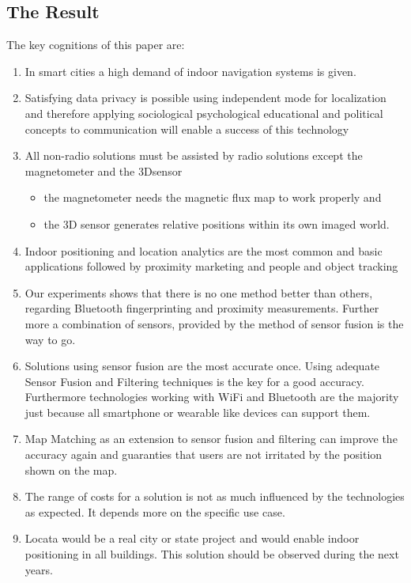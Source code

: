 \subsection{The Result}
The key cognitions of this paper are:
\begin{enumerate}
	\item In smart cities a high demand of indoor navigation systems is given.
	\item Satisfying data privacy is possible using independent mode for localization and therefore applying sociological psychological educational and political concepts to communication will enable a success of this technology
	\item All non-radio solutions must be assisted by radio solutions except the magnetometer and the 3Dsensor
	\begin{itemize}
		\item the magnetometer needs the magnetic flux map to work properly and
		\item the 3D sensor generates relative positions within its own imaged world.
	\end{itemize}
	\item Indoor positioning and location analytics are the most common and basic applications followed by proximity marketing and people and object tracking
	\item Our experiments shows that there is no one method better than others, regarding Bluetooth fingerprinting and proximity measurements. Further more a combination of sensors, provided by the method of sensor fusion is the way to go.
	\item Solutions using sensor fusion are the most accurate once. Using adequate Sensor Fusion and Filtering techniques is the key for a good accuracy. Furthermore technologies working with WiFi and Bluetooth are the majority just because all smartphone or wearable like devices can support them.
	\item Map Matching as an extension to sensor fusion and filtering can improve the accuracy again and guaranties that users are not irritated by the position shown on the map.
	\item The range of costs for a solution is not as much influenced by the technologies as expected. It depends more on the specific use case.
	\item Locata would be a real city or state project and would enable indoor positioning in all buildings. This solution should be observed during the next years.
\end{enumerate}

